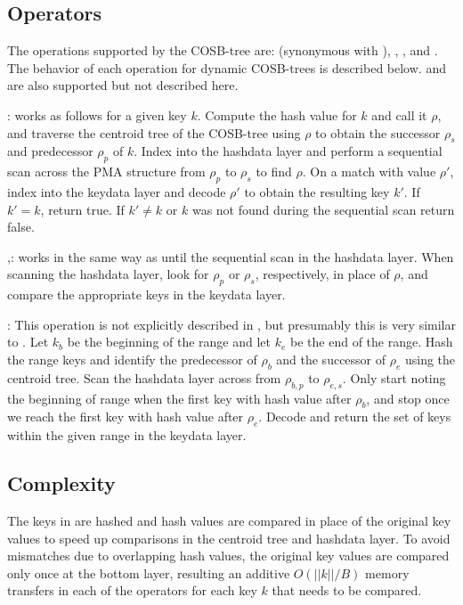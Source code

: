 \documentclass{style}
\begin{document}
\subsection{Operators}


The operations supported by the COSB-tree are: \Search{} (synonymous with \Member{}), \Pred{}, \Succ{},
and \Range{}. The behavior of each operation for dynamic COSB-trees is
described below. \Insertkonly{} and \Delete{} are also supported but not
described here.

\Search{}: works as follows for a given key $k$. Compute the hash value for
$k$ and call it $\rho$, and traverse the centroid tree of the COSB-tree using
$\rho$ to obtain the successor $\rho_{s}$ and predecessor $\rho_{p}$ of $k$.
Index into the hashdata layer and perform a sequential scan across the PMA
structure from $\rho_{p}$ to $\rho_{s}$ to find $\rho$. On a match with value
$\rho'$, index into the keydata layer and decode $\rho'$ to obtain the
resulting key $k'$. If $k' = k$, return true. If $k' \ne k$ or $k$ was not
found during the sequential scan return false.

\Pred{},\Succ{}: works in the same way as \Search{} until the sequential scan
in the hashdata layer. When scanning the hashdata layer, look for $\rho_{p}$
or $\rho_{s}$, respectively, in place of $\rho$, and compare the appropriate
keys in the keydata layer.

\Range{}: This operation is not explicitly described in \cite{BenderFaKu06}, but presumably this is very similar to
\Search{}. Let $k_{b}$ be the beginning of the range and let $k_{e}$ be the
end of the range. Hash the range keys and identify the predecessor of
$\rho_{b}$ and the successor of $\rho_{e}$ using the centroid tree. Scan the
hashdata layer across from $\rho_{b,p}$ to $\rho_{e,s}$. Only start noting the
beginning of range when the first key with hash value after $\rho_{b}$, and
stop once we reach the first key with hash value after $\rho_{e}$. Decode and
return the set of keys within the given range in the keydata layer.

\subsection{Complexity}
The keys in are hashed and hash values are compared in place of the original key values to speed up comparisons in the centroid tree and hashdata layer. To avoid mismatches due to overlapping hash values, the original key values are compared only once at the bottom layer, resulting an additive $O(||k||/B)$ memory transfers in each of the operators for each key $k$ that needs to be compared.
\end{document}
